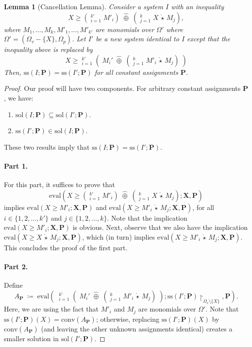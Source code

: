 \documentclass[10pt]{amsart}
\theoremstyle{plain}
\newtheorem{lemma}{Lemma}[section]
\theoremstyle{definition}
\providecommand{\bP}[0]{\ensuremath{\mathbf P}\xspace}
\providecommand{\bX}[0]{\ensuremath{\mathbf X}\xspace}
\let\geq\geqslant
\providecommand{\defeq}[0]{\ensuremath{\;\coloneqq\;}\xspace}
\providecommand{\cplus}[0]{\ensuremath{\hat{\oplus}}\xspace}
\providecommand{\cmult}[0]{\ensuremath{{\,\mathring{\star}\,}}\xspace}
\providecommand{\conv}[1]{\ensuremath{\mathrm{conv}{\left({#1}\right)}\xspace}}
\providecommand{\sol}{\ensuremath{\mathrm{sol}}\xspace}
\providecommand{\ssol}{\ensuremath{\mathrm{ss}}\xspace}
\providecommand{\evalmap}[0]{\ensuremath{\mathrm{eval}}\xspace}
\begin{document}
\begin{lemma}[Cancellation Lemma]\label{lem:cancel}
    Consider a system $I$ with an inequality
        $$ X \geq \left(\mathop{\cplus}_{i=1}^{k'} M'_i\right) \;\cplus\; \left(\mathop{\cplus}_{j=1}^k X\cmult M_j\right),$$
    where $M_1, \dotsc, M_k,M'_1, \dotsc, M'_{k'}$ are monomials over $\Omega'$ where $\Omega' = (\Omega_v - \{X\},\Omega_p)$. 
    Let $I'$ be a new system identical to $I$ except that the inequality above is replaced by 
        $$ X \geq \mathop{\cplus}_{i=1}^{k'} \left( \; M_i' \;\cplus\; \left( \mathop{\cplus}_{j=1}^k M'_i\cmult M_j\right) \;\right)$$
    Then, $\ssol(I;\bP)=\ssol(I';\bP)$ for all constant assignments $\bP$. 
\end{lemma}
\begin{proof}
    Our proof will have two components. 
    For arbitrary constant assignments $\bP$, we have: 
    \begin{enumerate}
        \item $\sol(I;\bP) \subseteq \sol(I';\bP)$. 
        \item $\ssol(I';\bP) \in \sol(I;\bP)$.
    \end{enumerate}
    These two results imply that $\ssol(I;\bP)=\ssol(I';\bP)$. 


    \paragraph{Part 1.}
    For this part, it suffices to prove that
        $$ \evalmap\left( X \geq \left(\mathop{\cplus}_{i=1}^{k'} M'_i\right) \;\cplus\; \left(\mathop{\cplus}_{j=1}^k X\cmult M_j\right) ; \bX,\bP\right)$$
    implies $\evalmap\left(X \geq M'_i ; \bX, \bP\right)$ and $\evalmap\left(X \geq M'_i\cmult M_j ; \bX, \bP\right)$, for all $i\in\{1,2,\dotsc,k'\}$ and $j\in\{1,2,\dotsc,k\}$.
    Note that the implication $\evalmap\left(X \geq M'_i ; \bX, \bP\right)$ is obvious. 
    Next, observe that we also have the implication $\evalmap\left(X \geq X\cmult M_j ; \bX, \bP\right)$, which (in turn) implies $\evalmap\left(X \geq M'_i\cmult M_j ; \bX, \bP\right)$. 
    This concludes the proof of the first part. 

    \paragraph{Part 2.}
    Define 
        $$A_\bP \defeq \evalmap\left( \; \mathop{\cplus}_{i=1}^{k'} \left( \; M_i' \;\cplus\; \left( \mathop{\cplus}_{j=1}^k M'_i\cmult M_j\right) \;\right); \ssol(I';\bP)\restriction_{\Omega_v \setminus \{X\}},\bP\right).$$
    Here, we are using the fact that $M'_i$ and $M_j$ are monomials over $\Omega'$.
    Note that $\ssol(I';\bP)(X) = \conv{ A_\bP} $; otherwise, replacing $\ssol(I';\bP)(X)$ by  $\conv{A_\bP}$ (and leaving the other unknown assignments identical) creates a smaller solution in $\sol(I';\bP)$.
    

\end{proof}
\end{document}
